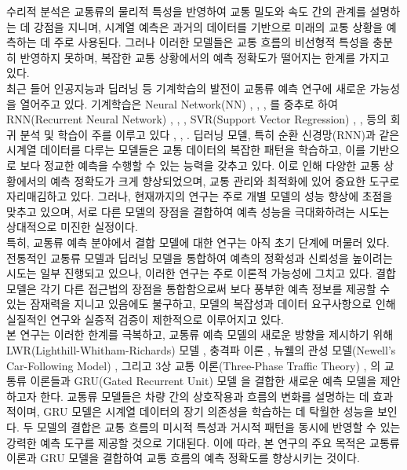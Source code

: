 \documentclass[11pt]{report}
\begin{document}
수리적 분석은 교통류의 물리적 특성을 반영하여 교통 밀도와 속도 간의 관계를 설명하는 데 강점을 지니며, 시계열 예측은 과거의 데이터를 기반으로 미래의 교통 상황을 예측하는 데 주로 사용된다. 
그러나 이러한 모델들은 교통 흐름의 비선형적 특성을 충분히 반영하지 못하며, 복잡한 교통 상황에서의 예측 정확도가 떨어지는 한계를 가지고 있다. \\
\indent 최근 들어 인공지능과 딥러닝 등 기계학습의 발전이 교통류 예측 연구에 새로운 가능성을 열어주고 있다. 
기계학습은 Neural Network(NN) \cite{Deep-learning-for-short-term-traffic-flow-prediction}, \cite{A_Neural_Network_Based_Traffic_Flow_Prediction_Model}, \cite{Deep-Neural-Networks-for-traffic-flow-prediction}, 
\cite{A-traffic-flow-forecasting-model-based-on-BP-neural-network} 를 중추로 하여 RNN(Recurrent Neural Network) \cite{Short-term-traffi-flow-prediction-with-LSTM-recurrent-neural-network}, 
\cite{Predicting-Short-Term-Traffic-Flow-by-Long-Short-Term-Memory-Recurrent-Neural-Network}, \cite{Using-LSTM-and-GRU-neural-network-methods-for-traffic-flow-prediction}, 
SVR(Support Vector Regression) \cite{Accurate-Multisteps-Traffic-Flow-Prediction-Based-on-SVM}, \cite{Short-Term-Traffic-Flow-Combined-Forecasting-Model-Based-on-SVM} 
, \cite{A-Short-Term-Traffic-Flow-Prediction-Method-Based-on-SVR} 등의 회귀 분석 및 학습이 주를 이루고 있다 \cite{hopfield1982neural}, \cite{cortes1995support}, \cite{vapnik2013nature}. 
딥러닝 모델, 특히 순환 신경망(RNN)과 같은 시계열 데이터를 다루는 모델들은 교통 데이터의 복잡한 패턴을 학습하고, 이를 기반으로 보다 정교한 예측을 수행할 수 있는 능력을 갖추고 있다. 
이로 인해 다양한 교통 상황에서의 예측 정확도가 크게 향상되었으며, 교통 관리와 최적화에 있어 중요한 도구로 자리매김하고 있다. 
그러나, 현재까지의 연구는 주로 개별 모델의 성능 향상에 초점을 맞추고 있으며, 서로 다른 모델의 장점을 결합하여 예측 성능을 극대화하려는 시도는 상대적으로 미진한 실정이다. \\
\indent 특히, 교통류 예측 분야에서 결합 모델에 대한 연구는 아직 초기 단계에 머물러 있다. 
전통적인 교통류 모델과 딥러닝 모델을 통합하여 예측의 정확성과 신뢰성을 높이려는 시도는 일부 진행되고 있으나, 이러한 연구는 주로 이론적 가능성에 그치고 있다. 
결합 모델은 각기 다른 접근법의 장점을 통합함으로써 보다 풍부한 예측 정보를 제공할 수 있는 잠재력을 지니고 있음에도 불구하고, 모델의 복잡성과 데이터 요구사항으로 인해 실질적인 연구와 실증적 검증이 제한적으로 이루어지고 있다. \\
\indent 본 연구는 이러한 한계를 극복하고, 교통류 예측 모델의 새로운 방향을 제시하기 위해 LWR(Lighthill-Whitham-Richards) 모델 \cite{lighthill1955kinematic}, 
충격파 이론 \cite{richards1956shock}, 뉴웰의 관성 모델(Newell’s Car-Following Model) \cite{newell1961nonlinear}, 
그리고 3상 교통 이론(Three-Phase Traffic Theory) \cite{PhysRevLett.81.3797}, \cite{doi:10.3141/1678-20} 의 교통류 이론들과 GRU(Gated Recurrent Unit) 모델 \cite{cho2014learning} 을 결합한 새로운 예측 모델을 제안하고자 한다. 
교통류 모델들은 차량 간의 상호작용과 흐름의 변화를 설명하는 데 효과적이며, GRU 모델은 시계열 데이터의 장기 의존성을 학습하는 데 탁월한 성능을 보인다. 
두 모델의 결합은 교통 흐름의 미시적 특성과 거시적 패턴을 동시에 반영할 수 있는 강력한 예측 도구를 제공할 것으로 기대된다. 
이에 따라, 본 연구의 주요 목적은 교통류 이론과 GRU 모델을 결합하여 교통 흐름의 예측 정확도를 향상시키는 것이다. 
\end{document}
